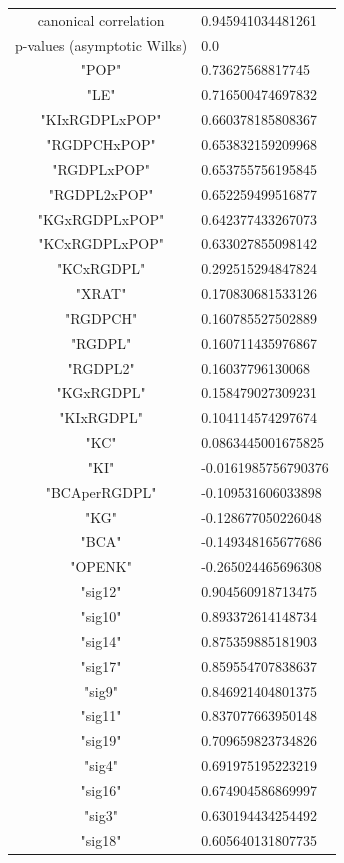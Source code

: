 \documentclass[11pt,a4paper,oneside]{report}
\begin{document}
\begin{tabular}{ c | l }
canonical correlation &  0.945941034481261\\
p-values (asymptotic Wilks) & 0.0\\
\hline
"POP"& 0.73627568817745\\
"LE"& 0.716500474697832\\
"KIxRGDPLxPOP"& 0.660378185808367\\
"RGDPCHxPOP"& 0.653832159209968\\
"RGDPLxPOP"& 0.653755756195845\\
"RGDPL2xPOP"& 0.652259499516877\\
"KGxRGDPLxPOP"& 0.642377433267073\\
"KCxRGDPLxPOP"& 0.633027855098142\\
"KCxRGDPL"& 0.292515294847824\\
"XRAT"& 0.170830681533126\\
"RGDPCH"& 0.160785527502889\\
"RGDPL"& 0.160711435976867\\
"RGDPL2"& 0.16037796130068\\
"KGxRGDPL"& 0.158479027309231\\
"KIxRGDPL"& 0.104114574297674\\
"KC"& 0.0863445001675825\\
"KI"& -0.0161985756790376\\
"BCAperRGDPL"& -0.109531606033898\\
"KG"& -0.128677050226048\\
"BCA"& -0.149348165677686\\
"OPENK"& -0.265024465696308\\
\hline
\cellcolor{col2} "sig12" & 0.904560918713475\\
\cellcolor{col1}"sig10"&  0.893372614148734\\
\cellcolor{col2}"sig14"& 0.875359885181903\\
\cellcolor{col3}"sig17"& 0.859554707838637\\
\cellcolor{col1}"sig9"& 0.846921404801375\\
\cellcolor{col1}"sig11"& 0.837077663950148\\
\cellcolor{col3}"sig19"& 0.709659823734826\\
\cellcolor{col1}"sig4" &0.691975195223219\\
\cellcolor{col2}"sig16"& 0.674904586869997\\
\cellcolor{col1}"sig3" &0.630194434254492\\
\cellcolor{col3}"sig18"& 0.605640131807735\\

\end{tabular}
\end{document}
